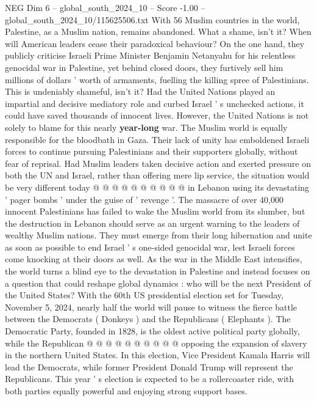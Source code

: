 \begin{textsample}{NEG Dim 6 – global\_south\_2024\_10 – Score -1.00 – global\_south\_2024\_10/115625506.txt}  \label{ex:f6_neg_029}
With 56 Muslim countries in the world, Palestine, as a Muslim nation, remains abandoned.
What a shame, isn't it?
When will American leaders cease their paradoxical behaviour?
On the one hand, they publicly criticise Israeli Prime Minister Benjamin Netanyahu for his relentless genocidal war in Palestine, yet behind closed doors, they furtively sell him millions of dollars ' worth of armaments, fuelling the killing spree of Palestinians.
This is undeniably shameful, isn't it?
Had the United Nations played an impartial and decisive mediatory role and curbed Israel ' s unchecked actions, it could have saved thousands of innocent lives.
However, the United Nations is not solely to blame for this nearly \textbf{year-long} war.
The Muslim world is equally responsible for the bloodbath in Gaza.
Their lack of unity has emboldened Israeli forces to continue pursuing Palestinians and their supporters globally, without fear of reprisal.
Had Muslim leaders taken decisive action and exerted pressure on both the UN and Israel, rather than offering mere lip service, the situation would be very different today @ @ @ @ @ @ @ @ @ @ in Lebanon using its devastating ' pager bombs ' under the guise of ' revenge '.
The massacre of over 40,000 innocent Palestinians has failed to wake the Muslim world from its slumber, but the destruction in Lebanon should serve as an urgent warning to the leaders of wealthy Muslim nations.
They must emerge from their long hibernation and unite as soon as possible to end Israel ' s one-sided genocidal war, lest Israeli forces come knocking at their doors as well.
As the war in the Middle East intensifies, the world turns a blind eye to the devastation in Palestine and instead focuses on a question that could reshape global dynamics : who will be the next President of the United States?
With the 60th US presidential election set for Tuesday, November 5, 2024, nearly half the world will pause to witness the fierce battle between the Democrats ( Donkeys ) and the Republicans ( Elephants ).
The Democratic Party, founded in 1828, is the oldest active political party globally, while the Republican @ @ @ @ @ @ @ @ @ @ opposing the expansion of slavery in the northern United States.
In this election, Vice President Kamala Harris will lead the Democrats, while former President Donald Trump will represent the Republicans.
This year ' s election is expected to be a rollercoaster ride, with both parties equally powerful and enjoying strong support bases.

\end{textsample}
